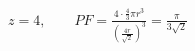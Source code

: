 \documentclass[preview]{standalone}
\begin{document}
\begin{align*}
z=4,\qquad PF=\frac{4\cdot\frac{4}{3}\pi r^{3}}{\left(\frac{4r}{\sqrt2}\right)^{3}}=\frac{\pi}{3\sqrt2}
\end{align*}
\end{document}
